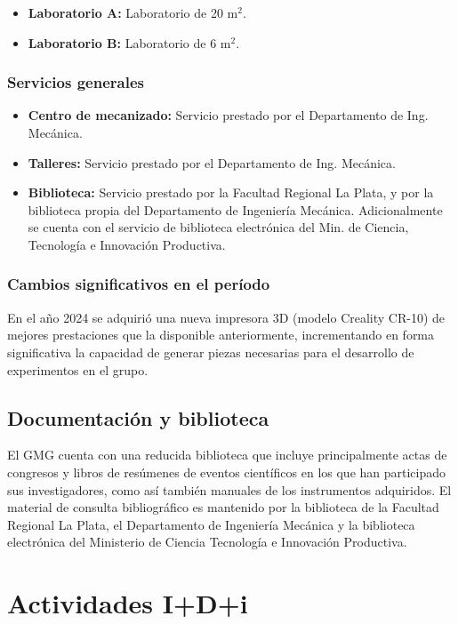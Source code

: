 \documentclass[a4paper,11pt,twoside,final,titlepage,onecolumn,openright]{report}
\begin{document}
\begin{itemize}
 \item {\bf Laboratorio A:} Laboratorio de 20 m$^2$.
 \item {\bf Laboratorio B:} Laboratorio de 6 m$^2$.
\end{itemize}

\subsection{Servicios generales}

\begin{itemize}
 \item {\bf Centro de mecanizado:} Servicio prestado por el Departamento de Ing. Mecánica.
 \item {\bf Talleres:} Servicio prestado por el Departamento de Ing. Mecánica.
 \item {\bf Biblioteca:} Servicio prestado por la Facultad Regional La Plata, y por la biblioteca propia del Departamento de Ingeniería Mecánica. Adicionalmente se cuenta con el servicio de biblioteca electrónica del Min. de Ciencia, Tecnología e Innovación Productiva. 
\end{itemize}

\subsection{Cambios significativos en el período}
En el año 2024 se adquirió una nueva impresora 3D (modelo Creality CR-10) de mejores prestaciones que la disponible anteriormente, incrementando en forma significativa la capacidad de generar piezas necesarias para el desarrollo de experimentos en el grupo. 

\section{Documentación y biblioteca}

El GMG cuenta con una reducida biblioteca que incluye principalmente actas de congresos y libros de resúmenes de eventos científicos en los que han participado sus investigadores, como así también manuales de los instrumentos adquiridos. El material de consulta bibliográfico es mantenido por la biblioteca de la Facultad Regional La Plata, el Departamento de Ingeniería Mecánica y la biblioteca electrónica del Ministerio de Ciencia Tecnología e Innovación Productiva. 

\chapter{Actividades I+D+i}
\end{document}
